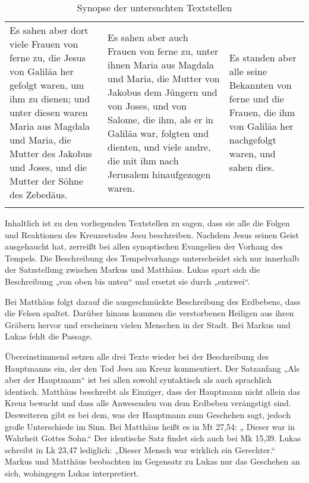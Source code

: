 \begin{center}
\begin{longtable}{p{4cm}|p{4cm}|p{4cm}}
Es sahen aber dort viele Frauen von ferne zu, die Jesus von Galiläa her gefolgt waren, um ihm zu dienen; und unter diesen waren Maria aus Magdala und Maria, die Mutter des Jakobus und Joses, und die Mutter der Söhne des Zebedäus.

&

Es sahen aber auch Frauen von ferne zu, unter ihnen Maria aus Magdala und Maria, die Mutter von Jakobus dem Jüngern und von Joses, und von Salome, die ihm, als er in Galiläa war, folgten und dienten, und viele andre, die mit ihm nach Jerusalem hinaufgezogen waren.

&

Es standen aber alle seine Bekannten von ferne und die Frauen, die ihm von Galiläa her nachgefolgt waren, und sahen dies.

\\

\caption{Synopse der untersuchten Textstellen\label{tab:synopse}}
\end{longtable}
\end{center}

Inhaltlich ist zu den vorliegenden Textstellen zu sagen, dass sie alle die Folgen und Reaktionen des Kreuzestodes Jesu beschreiben.  Nachdem Jesus seinen Geist ausgehaucht hat, zerreißt bei allen synoptischen Evangelien der Vorhang des Tempels. Die Beschreibung des Tempelvorhangs unterscheidet sich nur innerhalb der Satzstellung zwischen Markus und Matthäus. Lukas spart sich die Beschreibung „von oben bis unten“ und ersetzt sie durch „entzwei“.

Bei Matthäus folgt darauf die ausgeschmückte Beschreibung des Erdbebens, dass die Felsen spaltet. Darüber hinaus kommen die verstorbenen Heiligen aus ihren Gräbern hervor und erscheinen vielen Menschen in der Stadt. Bei Markus und Lukas fehlt die Passage.

Übereinstimmend setzen alle drei Texte wieder bei der Beschreibung des Hauptmanns ein, der den Tod Jesu am Kreuz kommentiert. Der Satzanfang „Als aber der Hauptmann“ ist bei allen sowohl syntaktisch als auch sprachlich identisch. Matthäus beschreibt als Einziger, dass der Hauptmann nicht allein das Kreuz bewacht und dass alle Anwesenden von dem Erdbeben verängstigt sind. Desweiteren gibt es bei dem, was der Hauptmann zum Geschehen sagt, jedoch große Unterschiede im Sinn. Bei Matthäus heißt es in Mt 27,54: „ Dieser war in Wahrheit Gottes Sohn.“ Der identische Satz findet sich auch bei Mk 15,39. Lukas schreibt in Lk 23,47 lediglich: „Dieser Mensch war wirklich ein Gerechter.“ Markus und Matthäus beobachten im Gegensatz zu Lukas nur das Geschehen an sich, wohingegen Lukas interpretiert.

